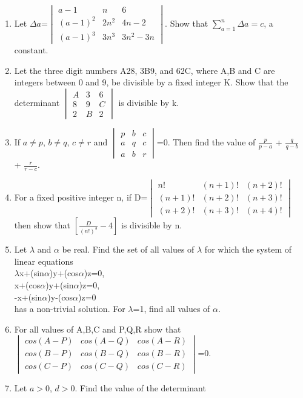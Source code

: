 \begin{enumerate}[label=\arabic*.,ref=\thesubsection.\theenumi]
\item Let $\Delta a$=$\begin{vmatrix} a-1 & n & 6 \\ (a-1)^2 & 2n^2 & 4n-2 \\ (a-1)^3 & 3n^3 & 3n^2 - 3n\end{vmatrix}$. Show that $\sum_{a=1}^{n} \Delta a = c$, a constant.
\item Let the three digit numbers A28, 3B9, and 62C, where A,B and C are integers between 0 and 9, be divisible by a fixed integer K. Show that the determinant $\begin{vmatrix} A & 3 & 6 \\ 8 & 9 & C \\ 2 & B & 2\end{vmatrix}$ is divisible by k.
\item If $a \neq p$, $b \neq q$, $c \neq r$ and $\begin{vmatrix} p & b & c \\ a & q & c \\ a & b & r\end{vmatrix}$=0. Then find the value of $\frac{p}{p-a}$ + $\frac{q}{q-b}$ +  $\frac{r}{r-c}$.
\item For a fixed positive integer n, if D=$\begin{vmatrix} n! & (n+1)! & (n+2)! \\ (n+1)! & (n+2)! & (n+3)! \\ (n+2)! & (n+3)! & (n+4)!\end{vmatrix}$ then show that $[\frac{D}{(n!)^3} -4]$ is divisible by n.
\item Let $\lambda$ and $\alpha$ be real. Find the set of all values of $\lambda$ for which the system of linear equations \\
$\lambda$x+(sin$\alpha$)y+(cos$\alpha$)z=0,\\
 x+(cos$\alpha$)y+(sin$\alpha$)z=0,\\
  -x+(sin$\alpha$)y-(cos$\alpha$)z=0\\
   has a non-trivial solution. For $\lambda$=1, find all values of $\alpha$.
\item For all values of A,B,C and P,Q,R show that $\begin{vmatrix} cos(A-P) & cos(A-Q) & cos(A-R) \\ cos(B-P) & cos(B-Q) & cos(B-R) \\ cos(C-P) & cos(C-Q) & cos(C-R)\end{vmatrix}$=0.
\item Let $a>0$, $d>0$. Find the value of the determinant\\

\end{enumerate}
